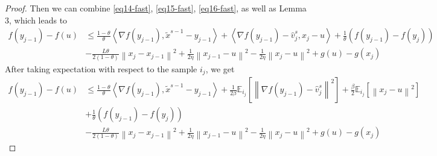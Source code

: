 \documentclass{article}
\newcommand*{\E}{\mathbb{E}}
\newcommand{\norm}[1]{\left\lVert#1\right\rVert}
\newcommand{\Iprod}[2]{\left\langle #1,#2\right\rangle}
\newcommand{\Initialize}{\textbf{Initialize:}{\,}}
\newcommand{\Input}{\textbf{Input:}{\,}}
\newcommand{\Output}{\textbf{Output:}{\,}}
\theoremstyle{definition}
\theoremstyle{remark}
\begin{document}
\begin{proof}
Then we can combine \eqref{eq14-fast}, \eqref{eq15-fast}, \eqref{eq16-fast}, as well as {\color{red} Lemma 3}, which leads to
\begin{equation}
\begin{split}
f(y_{j-1}) - f(u) &\leq \frac{1-\theta}{\theta} \Iprod{\nabla f(y_{j-1})}{\tilde{x}^{s-1}-y_{j-1}} + \Iprod{\nabla f(y_{j-1})-\hat{v}_j^s}{x_{j}-u} + \frac{1}{\theta}(f(y_{j-1}) - f(y_{j}))\\
&  - \frac{L\theta}{2(1-\theta)}\norm{x_j-x_{j-1}}^2+ \frac{1}{2\eta}\norm{x_{j-1}-u}^2 - \frac{1}{2\eta}\norm{x_j-u}^2+g(u) - g(x_j)
\end{split}
\end{equation}
After taking expectation with respect to the sample $i_j$, we get
\begin{equation}
\begin{split}
f(y_{j-1}) - f(u) &\leq \frac{1-\theta}{\theta} \Iprod{\nabla f(y_{j-1})}{\tilde{x}^{s-1}-y_{j-1}} + \frac{1}{2\beta}\E_{i_j}[\norm{\nabla f(y_{j-1})-\hat{v}_j^s}^2]+ \frac{\beta}{2}\E_{i_j}[\norm{x_{j}-u}^2]\\
& + \frac{1}{\theta}(f(y_{j-1}) - f(y_{j}))\\
&  - \frac{L\theta}{2(1-\theta)}\norm{x_j-x_{j-1}}^2+ \frac{1}{2\eta}\norm{x_{j-1}-u}^2 - \frac{1}{2\eta}\norm{x_j-u}^2+g(u) - g(x_j)
\end{split}
\end{equation}
\end{proof}
\end{document}
